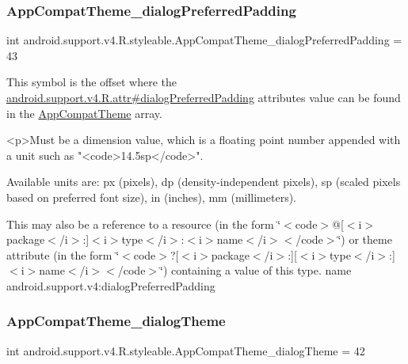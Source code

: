 \subsubsection{\texorpdfstring{App\+Compat\+Theme\+\_\+dialog\+Preferred\+Padding}{AppCompatTheme\_dialogPreferredPadding}}
{\footnotesize\ttfamily int android.\+support.\+v4.\+R.\+styleable.\+App\+Compat\+Theme\+\_\+dialog\+Preferred\+Padding = 43\hspace{0.3cm}{\ttfamily [static]}}

This symbol is the offset where the \hyperlink{classandroid_1_1support_1_1v4_1_1R_1_1attr_a2c1ecb946d64692496cf48a36058b2fb}{android.\+support.\+v4.\+R.\+attr\#dialog\+Preferred\+Padding} attribute\textquotesingle{}s value can be found in the \hyperlink{classandroid_1_1support_1_1v4_1_1R_1_1styleable_ac07ebbe62ed977f6dcaadc6397840ace}{App\+Compat\+Theme} array.

\begin{DoxyVerb}      <p>Must be a dimension value, which is a floating point number appended with a unit such as "<code>14.5sp</code>".
\end{DoxyVerb}
 Available units are\+: px (pixels), dp (density-\/independent pixels), sp (scaled pixels based on preferred font size), in (inches), mm (millimeters). 

This may also be a reference to a resource (in the form \char`\"{}$<$code$>$@\mbox{[}$<$i$>$package$<$/i$>$\+:\mbox{]}$<$i$>$type$<$/i$>$\+:$<$i$>$name$<$/i$>$$<$/code$>$\char`\"{}) or theme attribute (in the form \char`\"{}$<$code$>$?\mbox{[}$<$i$>$package$<$/i$>$\+:\mbox{]}\mbox{[}$<$i$>$type$<$/i$>$\+:\mbox{]}$<$i$>$name$<$/i$>$$<$/code$>$\char`\"{}) containing a value of this type.  name android.\+support.\+v4\+:dialog\+Preferred\+Padding \mbox{\label{classandroid_1_1support_1_1v4_1_1R_1_1styleable_a3574ec976e7476da7ab6c1ba08c24d15}} 
\subsubsection{\texorpdfstring{App\+Compat\+Theme\+\_\+dialog\+Theme}{AppCompatTheme\_dialogTheme}}
{\footnotesize\ttfamily int android.\+support.\+v4.\+R.\+styleable.\+App\+Compat\+Theme\+\_\+dialog\+Theme = 42\hspace{0.3cm}{\ttfamily [static]}}

